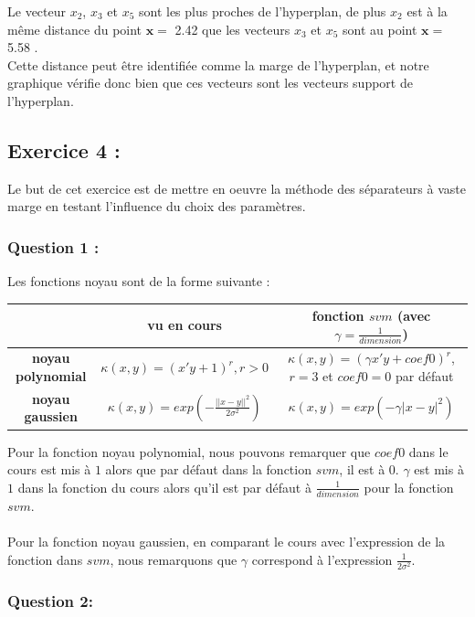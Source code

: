 \documentclass[a4paper, 10pt]{article}
\begin{document}
Le vecteur $x_{2}$, $x_{3}$ et $x_{5}$ sont les plus proches de l'hyperplan, de plus $x_{2}$ est à la même distance du point $\mathbf{x} =$ 2.42  que les vecteurs $x_{3}$ et $x_{5}$ sont au point $\mathbf{x} =$ 5.58 .\\
Cette distance peut être identifiée comme la marge de l'hyperplan, et notre graphique vérifie donc bien que ces vecteurs sont les vecteurs support de l'hyperplan.

\newpage
\subsection*{Exercice 4 :}

Le but de cet exercice est de mettre en oeuvre la méthode des séparateurs à vaste marge en testant l'influence du choix des paramètres.

\subsubsection*{Question 1 :}

Les fonctions noyau sont de la forme suivante :
\begin{center}
\renewcommand{\arraystretch}{1.8}
\begin{tabular}{|c|c|c|}
\hline
& vu en cours & fonction $svm$ (avec $\gamma = \frac{1}{dimension}$)\\
\hline
\textbf{noyau polynomial} & $\kappa(x,y) = (x'y + 1)^{r}, r > 0$ & $\kappa(x,y) = (\gamma x'y + coef0)^{r}$, $r = 3$ et $coef0 = 0$ par défaut\\
\hline
\textbf{noyau gaussien} & $\kappa(x,y) = exp(-\frac{||x - y||^{2}}{2\sigma^{2}})$ & $\kappa(x,y) = exp(-\gamma |x - y|^{2})$\\
\hline
\end{tabular}
\end{center}
Pour la fonction noyau polynomial, nous pouvons remarquer que $coef0$ dans le cours est mis à $1$ alors que par défaut dans la fonction $svm$, il est à $0$.
$\gamma$ est mis à $1$ dans la fonction du cours alors qu'il est par défaut à $\frac{1}{dimension}$ pour la fonction $svm$.\\ \\
Pour la fonction noyau gaussien, en comparant le cours avec l'expression de la fonction dans $svm$, nous remarquons que $\gamma$ correspond à l'expression $\frac{1}{2\sigma^{2}}$.

\subsubsection*{Question 2:}
\end{document}
